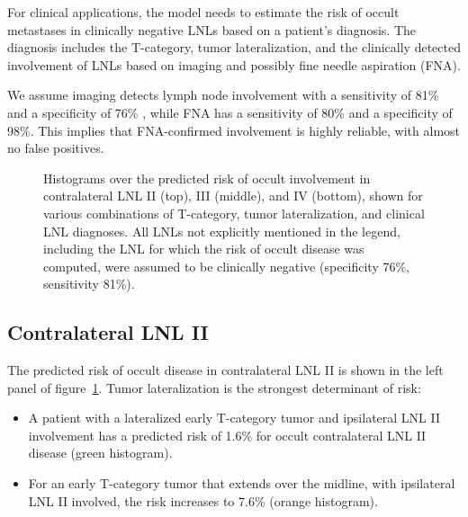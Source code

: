 \documentclass[
  sn-mathphys-num,
]{sn-jnl}
\providecommand{\tightlist}{%
  \setlength{\itemsep}{0pt}\setlength{\parskip}{0pt}}\usepackage{longtable,booktabs,array}
\begin{document}
For clinical applications, the model needs to estimate the risk of
occult metastases in clinically negative LNLs based on a patient's
diagnosis. The diagnosis includes the T-category, tumor lateralization,
and the clinically detected involvement of LNLs based on imaging and
possibly fine needle aspiration (FNA).

We assume imaging detects lymph node involvement with a sensitivity of
81\% and a specificity of 76\% \citep{debondt_detection_2007}, while FNA
has a sensitivity of 80\% and a specificity of 98\%. This implies that
FNA-confirmed involvement is highly reliable, with almost no false
positives.

\begin{figure}

\centering{



}

\caption{\label{fig-model-risks}Histograms over the predicted risk of
occult involvement in contralateral LNL II (top), III (middle), and IV
(bottom), shown for various combinations of T-category, tumor
lateralization, and clinical LNL diagnoses. All LNLs not explicitly
mentioned in the legend, including the LNL for which the risk of occult
disease was computed, were assumed to be clinically negative
(specificity 76\%, sensitivity 81\%).}

\end{figure}%

\subsection{Contralateral LNL II}\label{contralateral-lnl-ii}

The predicted risk of occult disease in contralateral LNL II is shown in
the left panel of figure~\ref{fig-model-risks}. Tumor lateralization is
the strongest determinant of risk:

\begin{itemize}
\tightlist
\item
  A patient with a lateralized early T-category tumor and ipsilateral
  LNL II involvement has a predicted risk of 1.6\% for occult
  contralateral LNL II disease (green histogram).\\
\item
  For an early T-category tumor that extends over the midline, with
  ipsilateral LNL II involved, the risk increases to 7.6\% (orange
  histogram).
\end{itemize}
\end{document}
